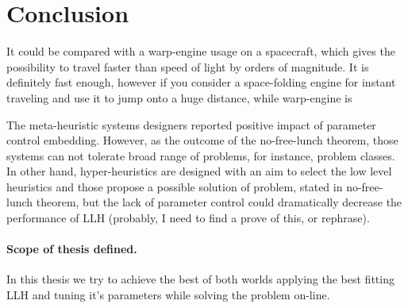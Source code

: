 \section{Conclusion}



It could be compared with a warp-engine usage on a spacecraft, which gives the possibility to travel faster than speed of light by orders of magnitude. It is definitely fast enough, however if you consider a space-folding engine for instant traveling and use it to jump onto a huge distance, while warp-engine is 


The meta-heuristic systems designers reported positive impact of parameter control embedding. 
However, as the outcome of the no-free-lunch theorem, those systems can not tolerate broad range of problems, for instance, problem classes.
In other hand, hyper-heuristics are designed with an aim to select the low level heuristics and those propose a possible solution of problem, stated in no-free-lunch theorem, but the lack of parameter control could dramatically decrease the performance of LLH (probably, I need to find a prove of this, or rephrase).

\paragraph{Scope of thesis defined.} In this thesis we try to achieve the best of both worlds applying the best fitting LLH and tuning it's parameters while solving the problem on-line.